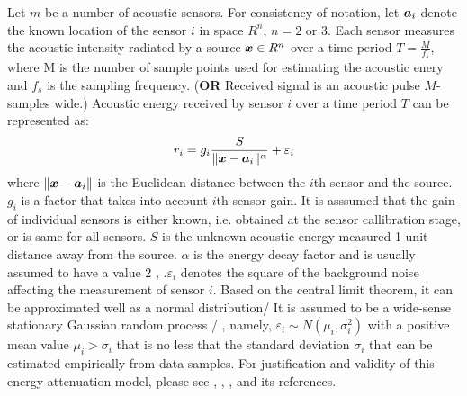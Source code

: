 Let $m$ be a number of acoustic sensors. For consistency of notation, let $\mbox{\boldmath$a$}_i$ denote the known location of the sensor $i$ in space $R^n$, $n = 2$ or $3$. Each sensor measures the acoustic intensity radiated by a source $\mbox{\boldmath$x$}\in R^n$ over a time period $T = \frac{M}{f_s}$, where M is the number of sample points used for estimating the acoustic enery and $f_s$ is the sampling frequency.  (\textbf{OR} Received signal is an acoustic pulse $M$-samples wide.)
 Acoustic energy received by sensor $i$ over a time period $T$ can be represented as:
\begin{equation} \label{eq:3.33}
r_i = g_i \frac{S}{\|\mbox{\boldmath$x$} - \mbox{\boldmath$a$}_i\|^\alpha} + \varepsilon_i
\end{equation}
where $\|\mbox{\boldmath$x$} - \mbox{\boldmath$a$}_i\|$ is the Euclidean distance between the $i$th sensor and the source. $g_i$ is a factor that takes into account $i$th sensor gain. It is asssumed that the gain of individual sensors is either known, i.e. obtained at the sensor callibration stage, or is same for all sensors. $S$ is the unknown acoustic energy measured 1 unit distance away from the source. $\alpha$ is the energy decay factor %
and is usually assumed to have a value 2 \cite{LiHu}, \cite{GeoLoc}.$\varepsilon_i$ denotes the square of the background noise affecting the measurement of sensor $i$. Based on the central limit theorem, it can be approximated well as a normal distribution/ It is assumed to be a wide-sense stationary Gaussian random process \cite{LiuHuPan} / , namely, $\varepsilon_i \sim N(\mu_i, \sigma_i^2)$ with a positive mean value $\mu_i > \sigma_i$ that is no less that the standard deviation $\sigma_i$ that can be estimated empirically from data samples. For justification and validity of this energy attenuation model, please see \cite{ShengHu}, \cite{LiHu}, \cite{Saric}, \cite{LiuHuPan} and its references. 


